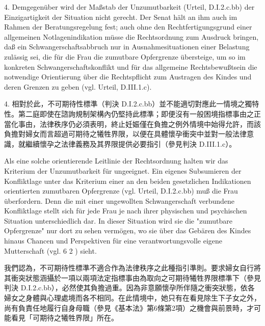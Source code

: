 \documentclass[12pt]{article}
\begin{document}
\begin{sourcepara}[title={原文SondervotumMS.284}]
4. Demgegenüber wird der Maßstab der Unzumutbarkeit (Urteil, D.I.2.c.bb) der Einzigartigkeit der Situation nicht gerecht. Der Senat hält an ihm auch im Rahmen der Beratungsregelung fest; auch ohne den Rechtfertigungsgrund einer allgemeinen Notlagenindikation müsse die Rechtsordnung zum Ausdruck bringen, daß ein Schwangerschaftsabbruch nur in Ausnahmesituationen einer Belastung zulässig sei, die für die Frau die zumutbare Opfergrenze übersteige, um so im konkreten Schwangerschaftskonflikt und für das allgemeine Rechtsbewußtsein die notwendige Orientierung über die Rechtspflicht zum Austragen des Kindes und deren Grenzen zu geben (vgl. Urteil, D.III.1.c).
\end{sourcepara}
\begin{transpara}
4. 相對於此，不可期待性標準（判決 D.I.2.c.bb）並不能適切對應此一情境之獨特性。第二庭即使在諮詢規制架構內仍堅持此標準；即便沒有一般困境指標事由之正當化事由，法律秩序仍必須表明，終止妊娠僅在負擔之例外情境中始得允許，而該負擔對婦女而言超過可期待之犧牲界限，以便在具體懷孕衝突中並對一般法律意識，就繼續懷孕之法律義務及其界限提供必要指引（參見判決 D.III.1.c）。
\end{transpara}

\begin{sourcepara}[title={原文SondervotumMS.285}]
Als eine solche orientierende Leitlinie der Rechtsordnung halten wir das Kriterium der Unzumutbarkeit für ungeeignet. Ein eigenes Subsumieren der Konfliktlage unter das Kriterium einer an den beiden gesetzlichen Indikationen orientierten zumutbaren Opfergrenze (vgl. Urteil, D.I.2.c.bb) muß die Frau überfordern. Denn die mit einer ungewollten Schwangerschaft verbundene Konfliktlage stellt sich für jede Frau je nach ihrer physischen und psychischen Situation unterschiedlich dar. In dieser Situation wird sie die "zumutbare Opfergrenze" nur dort zu sehen vermögen, wo sie über das Gebären des Kindes hinaus Chancen und Perspektiven für eine verantwortungsvolle eigene Mutterschaft (vgl. \abbrArt{} 6 \abbrAbs{} 2 \abbrGG{}\ggfnArtSixTwoDE{}) sieht.
\end{sourcepara}
\begin{transpara}
我們認為，不可期待性標準不適合作為法律秩序之此種指引準則。要求婦女自行將其衝突狀態涵攝於一項以兩項法定指標事由為取向之可期待犧牲界限標準下（參見判決 D.I.2.c.bb），必然使其負擔過重。因為非意願懷孕所伴隨之衝突狀態，依各婦女之身體與心理處境而各不相同。在此情境中，她只有在看見除生下子女之外，尚有負責任地履行自身母職（參見《基本法》第6條第2項\ggfnArtSixTwoZH{}）之機會與前景時，才可能看見「可期待之犧牲界限」所在。
\end{transpara}
\end{document}
